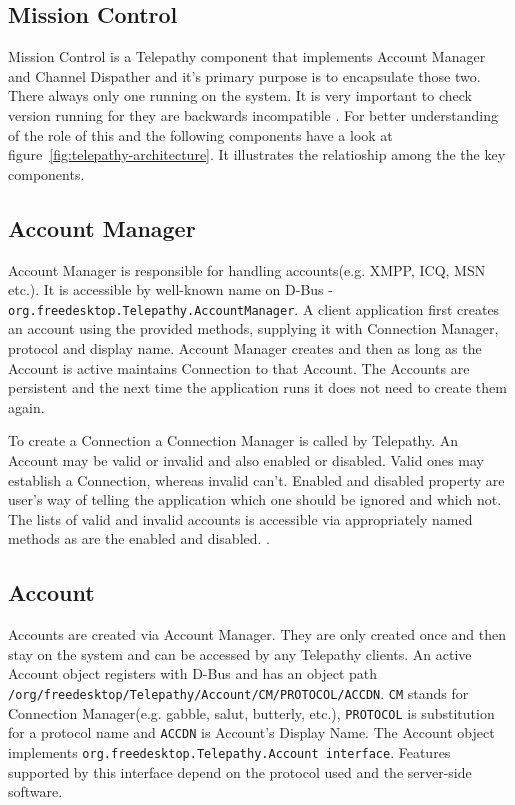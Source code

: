 \subsection*{Mission Control}
Mission Control is a Telepathy component that implements Account Manager and Channel Dispather and it's primary purpose is to encapsulate those two. There always only one running on the system. It is very important to check version running for they are backwards incompatible \cite{TPWiki}. For better understanding of the role of this and the following components have a look at figure~\ref{fig:telepathy-architecture}. It illustrates the relatioship among the the key components.

\subsection*{Account Manager}
Account Manager is responsible for handling accounts(e.g. XMPP, ICQ, MSN etc.). It is accessible by well-known name on D-Bus - \verb|org.freedesktop.Telepathy.AccountManager|. A client application first creates an account using the provided methods, supplying it with Connection Manager, protocol and display name. Account Manager creates and then as long as the Account is active maintains Connection to that Account. The Accounts are persistent and the next time the application runs it does not need to create them again. 

To create a Connection a Connection Manager is called by Telepathy. An Account may be valid or invalid and also enabled or disabled. Valid ones may establish a Connection, whereas invalid can't. Enabled and disabled property are user's way of telling the application which one should be ignored and which not. The lists of valid and invalid accounts is accessible via appropriately named methods as are the enabled and disabled.  \cite{TPWiki}.

\subsection*{Account}
Accounts are created via Account Manager. They are only created once and then stay on the system and can be accessed by any Telepathy clients. An active Account object registers with D-Bus and has an object path \verb|/org/freedesktop/Telepathy/Account/CM/PROTOCOL/ACCDN|. \verb|CM| stands for Connection Manager(e.g. gabble, salut, butterly, etc.), \verb|PROTOCOL| is substitution for a protocol name and \verb|ACCDN| is Account's Display Name. The Account object implements \verb|org.freedesktop.Telepathy.Account interface|. Features supported by this interface depend on the protocol used and the server-side software. 

